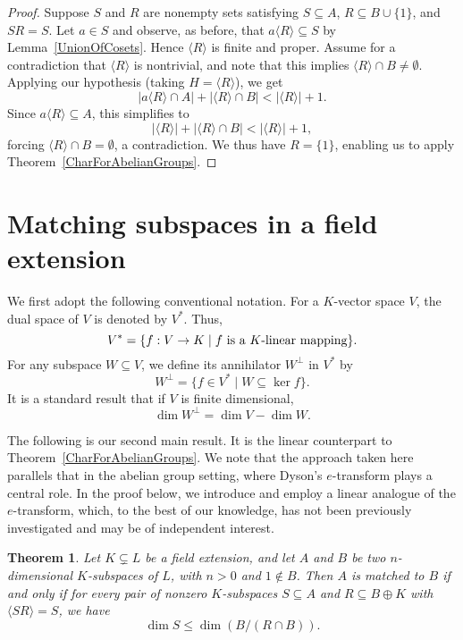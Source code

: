 \documentclass[11pt]{amsart}
\newtheorem{theorem}{Theorem}[section]
\theoremstyle{definition}
\theoremstyle{remark}
\begin{document}
\begin{proof}
Suppose \( S \) and \( R \) are nonempty sets satisfying \( S \subseteq A \), \( R \subseteq B \cup \{ 1 \} \), and \( SR = S \). Let \( a \in S \) and observe, as before, that \( a \langle R \rangle \subseteq S \) by Lemma~\ref{UnionOfCosets}. Hence \( \langle R \rangle \) is finite and proper.  Assume for a contradiction that \( \langle R \rangle \) is nontrivial, and note that this implies \( \langle R \rangle \cap B \neq \emptyset \). Applying our hypothesis (taking \( H = \langle R \rangle \)), we get 
\[ |a \langle R \rangle \cap A| + | \langle R \rangle \cap B| < | \langle R \rangle | + 1. \]
Since \( a \langle R \rangle \subseteq A \), this simplifies to
\[ |\langle R \rangle| + | \langle R \rangle \cap B| < | \langle R \rangle | + 1, \]
forcing \( \langle R \rangle \cap B = \emptyset \), a contradiction. We thus have \( R  = \{ 1 \} \), enabling us to apply Theorem~\ref{CharForAbelianGroups}.
\end{proof}




\section{Matching subspaces in a field extension}\label{MSFE}


We first adopt the following conventional notation. For a $K$-vector space $V$, the dual space of \( V \) is denoted by \( V^* \).  Thus, 
\[
V^* = \{ f : V \to K \mid f \text{ is a \( K \)-linear mapping} \}.
\]
For any subspace \( W \subseteq V \), we define its annihilator \( W^\perp \) in \( V^* \) by
\[
W^\perp = \{ f \in V^* \mid W \subseteq \ker f \}.
\]
It is a standard result that if \( V \) is finite dimensional, 
\[
\dim W^\perp = \dim V - \dim W.
\]

The following is our second main result. It is the linear counterpart to Theorem~\ref{CharForAbelianGroups}. We note that the approach taken here parallels that in the abelian group setting, where Dyson’s $e$-transform plays a central role. In the proof below, we introduce and employ a linear analogue of the $e$-transform, which, to the best of our knowledge, has not been previously investigated and may be of independent interest.

\begin{theorem}\label{main linear}
    Let \( K \subsetneq L \) be a field extension, and let \( A \) and \( B \) be two \( n \)-dimensional \( K \)-subspaces of \( L \), with \( n > 0 \) and \( 1 \notin B \). Then \( A \) is matched to \( B \) if and only if for every pair of nonzero \( K \)-subspaces \( S \subseteq A \) and \( R \subseteq B\oplus K \) with \( \langle SR \rangle = S \), we have
\[
\dim S\leq \dim (B/(R \cap B)).
\]
\end{theorem}
\end{document}
